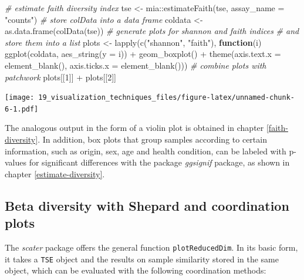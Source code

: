 \documentclass[
]{book}
\newenvironment{Shaded}{\begin{snugshade}}{\end{snugshade}}
\newcommand{\AttributeTok}[1]{\textcolor[rgb]{0.77,0.63,0.00}{#1}}
\newcommand{\CommentTok}[1]{\textcolor[rgb]{0.56,0.35,0.01}{\textit{#1}}}
\newcommand{\ControlFlowTok}[1]{\textcolor[rgb]{0.13,0.29,0.53}{\textbf{#1}}}
\newcommand{\DecValTok}[1]{\textcolor[rgb]{0.00,0.00,0.81}{#1}}
\newcommand{\FunctionTok}[1]{\textcolor[rgb]{0.00,0.00,0.00}{#1}}
\newcommand{\NormalTok}[1]{#1}
\newcommand{\OtherTok}[1]{\textcolor[rgb]{0.56,0.35,0.01}{#1}}
\newcommand{\SpecialCharTok}[1]{\textcolor[rgb]{0.00,0.00,0.00}{#1}}
\newcommand{\StringTok}[1]{\textcolor[rgb]{0.31,0.60,0.02}{#1}}
\begin{document}
\begin{Shaded}
\begin{Highlighting}[]
\CommentTok{\# estimate faith diversity index}
\NormalTok{tse }\OtherTok{\textless{}{-}}\NormalTok{ mia}\SpecialCharTok{::}\FunctionTok{estimateFaith}\NormalTok{(tse,}
                          \AttributeTok{assay\_name =} \StringTok{"counts"}\NormalTok{)}
\CommentTok{\# store colData into a data frame}
\NormalTok{coldata }\OtherTok{\textless{}{-}} \FunctionTok{as.data.frame}\NormalTok{(}\FunctionTok{colData}\NormalTok{(tse))}
\CommentTok{\# generate plots for shannon and faith indices}
\CommentTok{\# and store them into a list}
\NormalTok{plots }\OtherTok{\textless{}{-}} \FunctionTok{lapply}\NormalTok{(}\FunctionTok{c}\NormalTok{(}\StringTok{"shannon"}\NormalTok{, }\StringTok{"faith"}\NormalTok{),}
                \ControlFlowTok{function}\NormalTok{(i) }\FunctionTok{ggplot}\NormalTok{(coldata, }\FunctionTok{aes\_string}\NormalTok{(}\AttributeTok{y =}\NormalTok{ i)) }\SpecialCharTok{+}
                  \FunctionTok{geom\_boxplot}\NormalTok{() }\SpecialCharTok{+}
                  \FunctionTok{theme}\NormalTok{(}\AttributeTok{axis.text.x =} \FunctionTok{element\_blank}\NormalTok{(),}
                        \AttributeTok{axis.ticks.x =} \FunctionTok{element\_blank}\NormalTok{()))}
\CommentTok{\# combine plots with patchwork}
\NormalTok{plots[[}\DecValTok{1}\NormalTok{]] }\SpecialCharTok{+}\NormalTok{ plots[[}\DecValTok{2}\NormalTok{]]}
\end{Highlighting}
\end{Shaded}

\texttt{[image: 19\_visualization\_techniques\_files/figure-latex/unnamed-chunk-6-1.pdf]}

The analogous output in the form of a violin plot is obtained in chapter
\ref{faith-diversity}. In addition, box plots that group samples according to
certain information, such as origin, sex, age and health condition, can be
labeled with p-values for significant differences with the package \emph{ggsignif}
package, as shown in chapter \ref{estimate-diversity}.

\hypertarget{beta-diversity-with-shepard-and-coordination-plots}{%
\subsection{Beta diversity with Shepard and coordination plots}\label{beta-diversity-with-shepard-and-coordination-plots}}

The \emph{scater} package offers the general function \texttt{plotReducedDim}. In its basic
form, it takes a \texttt{TSE} object and the results on sample similarity stored in the
same object, which can be evaluated with the following coordination methods:
\end{document}
